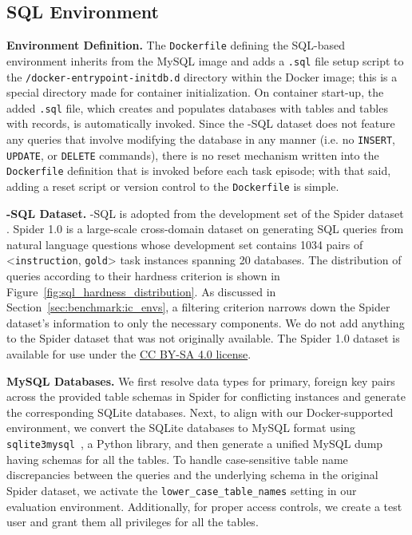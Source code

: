 

\subsection{SQL Environment}
\label{appx:env:sqlenv}
\textbf{Environment Definition.} The \texttt{Dockerfile} defining the SQL-based environment inherits from the MySQL image and adds a \texttt{.sql} file setup script to the \texttt{/docker-entrypoint-initdb.d} directory within the Docker image; this is a special directory made for container initialization. On container start-up, the added \texttt{.sql} file, which creates and populates databases with tables and tables with records, is automatically invoked. Since the \benchmark{}-SQL dataset does not feature any queries that involve modifying the database in any manner (i.e. no \texttt{INSERT}, \texttt{UPDATE}, or \texttt{DELETE} commands), there is no reset mechanism written into the \texttt{Dockerfile} definition that is invoked before each task episode; with that said, adding a reset script or version control to the \texttt{Dockerfile} is simple.

\textbf{\benchmark-SQL Dataset.}
\benchmark-SQL is adopted from the development set of the Spider dataset \cite{yu-etal-2018-spider}. Spider 1.0 is a large-scale cross-domain dataset on generating SQL queries from natural language questions whose development set contains 1034 pairs of <\texttt{instruction}, \texttt{gold}> task instances spanning 20 databases.
The distribution of queries according to their hardness criterion is shown in Figure~\ref{fig:sql_hardness_distribution}.
As discussed in Section~\ref{sec:benchmark:ic_envs}, a filtering criterion narrows down the Spider dataset's information to only the necessary components.
We do not add anything to the Spider dataset that was not originally available.
The Spider 1.0 dataset is available for use under the \hyperlink{https://creativecommons.org/licenses/by-sa/4.0/legalcode}{CC BY-SA 4.0 license}.



\textbf{MySQL Databases.} We first resolve data types for primary, foreign key pairs across the provided table schemas in Spider for conflicting instances and generate the corresponding SQLite databases. Next, to align with our Docker-supported environment, we convert the SQLite databases to MySQL format using \texttt{sqlite3mysql}~\cite{sqlite3mysql}, a Python library, and then generate a unified MySQL dump having schemas for all the tables. To handle case-sensitive table name discrepancies between the queries and the underlying schema in the original Spider dataset, we activate the \texttt{lower\_case\_table\_names} setting in our evaluation environment. Additionally, for proper access controls, we create a test user and grant them all privileges for all the tables.

